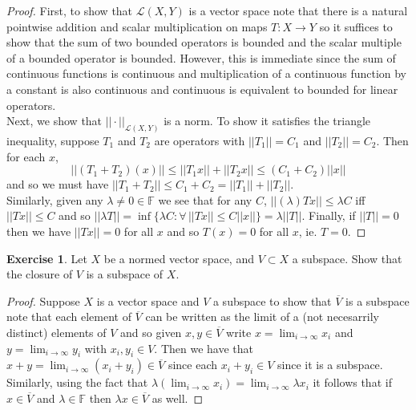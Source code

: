 \documentclass{article}
\newcommand{\bF}{\mathbb{F}}
\newcommand{\fa}{\forall}
\newcommand{\cL}{\mathcal{L}}
\theoremstyle{definition}
\newtheorem{exercise}{Exercise}
\begin{document}
\begin{proof}
    First, to show that $\cL(X,Y)$ is a vector space note that there is a natural pointwise addition and scalar multiplication on maps $T: X \to Y$ so it suffices to show that the sum of two bounded operators is bounded and the scalar multiple of a bounded operator is bounded. However, this is immediate since the sum of continuous functions is continuous and multiplication of a continuous function by a constant is also continuous and continuous is equivalent to bounded for linear operators. \\ 
    Next, we show that $||\cdot||_{\cL(X,Y)}$ is a norm. To show it satisfies the triangle inequality, suppose $T_1$ and $T_2$ are operators with $||T_1|| = C_1$ and $||T_2|| =C_2$. Then for each $x$, 
    \[ ||(T_1 + T_2)(x)|| \le ||T_1x|| + ||T_2x|| \le (C_1 + C_2)||x|| \] 
    and so we must have $||T_1 + T_2|| \le C_1 + C_2 = ||T_1|| + ||T_2||$. \\ 
    Similarly, given any $\lambda \neq 0 \in \bF$ we see that for any $C$, $||(\lambda)Tx|| \le \lambda C$ iff $||Tx|| \le C$ and so $||\lambda T|| = \inf\{ \lambda C \colon \fa \, ||Tx|| \le C||x|| \} = \lambda ||T||$. Finally, if $||T||=0$ then we have $||Tx||=0$ for all $x$ and so $T(x)=0$ for all $x$, ie. $T = 0$. 
\end{proof}

\begin{exercise}
    Let $X$ be a normed vector space, and $V \subset X$ a subspace. Show that the closure of $V$ is a subspace of $X$. 
\end{exercise}

\begin{proof}
    Suppose $X$ is a vector space and $V$ a subspace to show that $\overline{V}$ is a subspace note that each element of $\overline{V}$ can be written as the limit of a (not necesarrily distinct) elements of $V$ and so given $x, y \in \overline{V}$ write $x = \lim_{i \to \infty} x_i$ and $y = \lim_{i \to \infty} y_i$ with $x_i, y_i \in V$. Then we have that $x+y = \lim_{i \to \infty}(x_i + y_i) \in \overline{V}$ since each $x_i + y_i \in V$ since it is a subspace. Similarly, using the fact that $\lambda(\lim_{i \to \infty}x_i) = \lim_{i \to \infty}\lambda x_i$ it follows that if $x \in \overline{V}$ and $\lambda \in \bF$ then $\lambda x \in \overline{V}$ as well. 
\end{proof}
\end{document}
